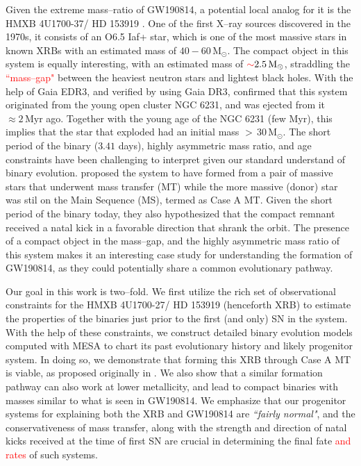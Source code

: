 \documentclass[linenumbers,trackchanges,twocolumn]{aastex701}
\newcommand{\Mdot}{\mathrm{M}_{\odot}}
\newcommand{\Myr}{\mathrm{Myr}}
\newcommand{\red}{\textcolor{red}}
\begin{document}
Given the extreme mass--ratio of GW190814, a potential local analog for it is the HMXB 4U1700-37/ HD 153919 \citep{2015A&A...577A.130F}. One of the first X--ray sources discovered in the 1970s, it consists of an O6.5 Iaf+ star, which is one of the most massive stars in known XRBs with an estimated mass of $40-60\,\Mdot$. The compact object in this system is equally interesting, with an estimated mass of $\red{\sim} 2.5\,\Mdot$, straddling the \red{``mass--gap"} between the heaviest neutron stars and lightest black holes. With the help of Gaia EDR3, and verified by \citep{2022MNRAS.511.4123H} using Gaia DR3, \citep{2021A&A...655A..31V} confirmed that this system originated from the young open cluster NGC 6231, and was ejected from it $\approx 2\,\Myr$ ago. Together with the young age of the NGC 6231 (few $\Myr$), this implies that the star that exploded had an initial mass $>\,30\,\Mdot$. The short period of the binary ($3.41$ days), highly asymmetric mass ratio, and age constraints have been challenging to interpret given our standard understand of binary evolution. \citep{2021A&A...655A..31V} proposed the system to have formed from a pair of massive stars that underwent mass transfer (MT) while the more massive (donor) star was stil on the Main Sequence (MS), termed as Case A MT. Given the short period of the binary today, they also hypothesized that the compact remnant received a natal kick in a favorable direction that shrank the orbit. The presence of a compact object in the mass--gap, and the highly asymmetric mass ratio of this system makes it an interesting case study for understanding the formation of GW190814, as they could potentially share a common evolutionary pathway. 

Our goal in this work is two--fold. We first utilize the rich set of observational constraints for the HMXB 4U1700-27/ HD 153919 (henceforth XRB) to estimate the properties of the binaries just prior to the first (and only) SN in the system. With the help of these constraints, we construct detailed binary evolution models computed with MESA to chart its past evolutionary history and likely progenitor system. In doing so, we demonstrate that forming this XRB through Case A MT is viable, as proposed originally in \citep{2021A&A...655A..31V}. We also show that a similar formation pathway can also work at lower metallicity, and lead to compact binaries with masses similar to what is seen in GW190814. We emphasize that our progenitor systems for explaining both the XRB and GW190814 are \textit{``fairly normal"}, and the conservativeness of mass transfer, along with the strength and direction of natal kicks received at the time of first SN are crucial in determining the final fate \red{and rates} of such systems.
\end{document}
